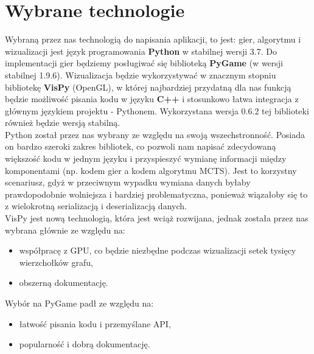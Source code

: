 \documentclass{article}
\let\oldsection\section
\renewcommand\section{\clearpage\oldsection}
\begin{document}
	
	\section{Wybrane technologie}
	Wybraną przez nas technologią do napisania aplikacji, to jest: gier, algorytmu i wizualizacji jest język programowania \textbf{Python} w stabilnej wersji 3.7. Do implementacji gier będziemy posługiwać się biblioteką \textbf{PyGame} (w wersji stabilnej 1.9.6). Wizualizacja będzie wykorzystywać w znacznym stopniu bibliotekę \textbf{VisPy} (OpenGL), w której najbardziej przydatną dla nas funkcją będzie możliwość pisania kodu w języku \textbf{C++} i stosunkowo łatwa integracja z głównym językiem projektu - Pythonem. Wykorzystana wersja 0.6.2 tej biblioteki również będzie wersją stabilną.\\
	
	\noindent Python został przez nas wybrany ze względu na swoją wszechstronność. Posiada on bardzo szeroki zakres bibliotek, co pozwoli nam napisać zdecydowaną większość kodu w jednym języku i przyspieszyć wymianę informacji między komponentami (np. kodem gier a kodem algorytmu MCTS). Jest to korzystny scenariusz, gdyż w przeciwnym wypadku wymiana danych byłaby prawdopodobnie wolniejsza i bardziej problematyczna, ponieważ wiązałoby się to z wielokrotną serializacją i deserializacją danych.\\
	
	\noindent VisPy jest nową technologią, która jest wciąż rozwijana, jednak została przez nas wybrana głównie ze względu na:
	\begin{itemize}
		\item współpracę z GPU, co będzie niezbędne podczas wizualizacji setek tysięcy wierzchołków grafu,
		\item obszerną dokumentację.\\
	\end{itemize}

	\noindent Wybór na PyGame padł ze względu na:
	\begin{itemize}
		\item łatwość pisania kodu i przemyślane API,
		\item popularność i dobrą dokumentację.\\
	\end{itemize}	
\end{document}
